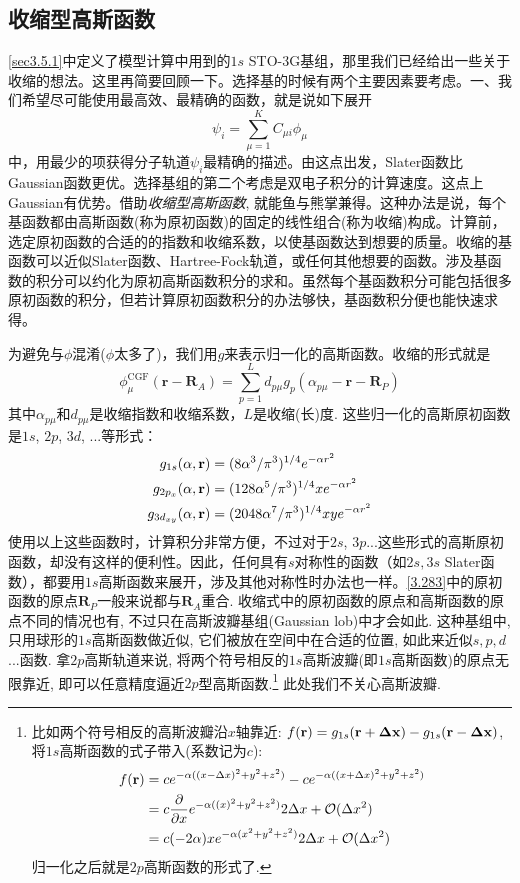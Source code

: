 {\subsection{收缩型高斯函数}
\ref{sec3.5.1}中定义了模型计算中用到的$1s$ STO-3G基组，那里我们已经给出一些关于收缩的想法。这里再简要回顾一下。选择基的时候有两个主要因素要考虑。一、我们希望尽可能使用最高效、最精确的函数，就是说如下展开
\begin{equation}
\psi_i=\sum_{\mu=1}^{K}C_{\mu i}\phi_\mu
\end{equation}
中，用最少的项获得分子轨道$\psi_i$最精确的描述。由这点出发，Slater函数比Gaussian函数更优。选择基组的第二个考虑是双电子积分的计算速度。这点上Gaussian有优势。借助\emph{收缩型高斯函数}, 就能鱼与熊掌兼得。这种办法是说，每个基函数都由高斯函数(称为原初函数)的固定的线性组合(称为收缩)构成。计算前，选定原初函数的合适的的指数和收缩系数，以使基函数达到想要的质量。收缩的基函数可以近似Slater函数、Hartree-Fock轨道，或任何其他想要的函数。涉及基函数的积分可以约化为原初高斯函数积分的求和。虽然每个基函数积分可能包括很多原初函数的积分，但若计算原初函数积分的办法够快，基函数积分便也能快速求得。

为避免与$\phi$混淆($\phi$太多了)，我们用$g$来表示归一化的高斯函数。收缩的形式就是
\begin{equation}
\phi^\mathrm{CGF}_\mu(\mathbf{r-R}_A)=\sum_{p=1}^{L}d_{p\mu}g_p(\alpha_{p\mu}-\mathbf{r-R}_P)
\end{equation}
其中$\alpha_{p\mu}$和$d_{p\mu}$是收缩指数和收缩系数，$L$是收缩(长)度. 这些归一化的高斯原初函数是$1s$, $2p$, $3d$, ...等形式：
\begin{align}
g_{1s}(\alpha,\mathbf{r})      & = (8\alpha^3/\pi^3)^{1/4}       e^{-\alpha r^2}\\
g_{2p_x}(\alpha,\mathbf{r})    & = (128\alpha^5/\pi^3)^{1/4}  x  e^{-\alpha r^2}\\
g_{3d_{xy}}(\alpha,\mathbf{r}) & = (2048\alpha^7/\pi^3)^{1/4} xy e^{-\alpha r^2}
\end{align}
使用以上这些函数时，计算积分非常方便，不过对于$2s$, $3p$...这些形式的高斯原初函数，却没有这样的便利性。因此，任何具有$s$对称性的函数（如$2s,3s$ Slater函数），都要用$1s$高斯函数来展开，涉及其他对称性时办法也一样。\eqref{3.283}中的原初函数的原点$\mathbf{R}_P$一般来说都与$\mathbf{R}_A$重合. 收缩式中的原初函数的原点和高斯函数的原点不同的情况也有, 不过只在高斯波瓣基组(Gaussian lob)中才会如此. 这种基组中, 只用球形的$1s$高斯函数做近似, 它们被放在空间中在合适的位置, 如此来近似$s,p,d$...函数. 拿$2p$高斯轨道来说, 将两个符号相反的$1s$高斯波瓣(即$1s$高斯函数)的原点无限靠近, 即可以任意精度逼近$2p$型高斯函数.\footnote{
比如两个符号相反的高斯波瓣沿$x$轴靠近: $f(\mathbf{r})=g_{1s}(\mathbf{r}+\mathbf{\Delta x})-g_{1s}(\mathbf{r}-\mathbf{\Delta x})$, 将$1s$高斯函数的式子带入(系数记为$c$):
\begin{align*}
f(\mathbf{r}) & = ce^{-\alpha((x-\Delta x)^2+y^2+z^2)}-
ce^{-\alpha((x+\Delta x)^2+y^2+z^2)}\\
        & = c\frac{\partial}{\partial x}e^{-\alpha((x)^2+y^2+z^2)}2\Delta x +\mathcal{O}(\Delta x^2)\\
        & = c(-2\alpha) xe^{-\alpha(x^2+y^2+z^2)}2\Delta x +\mathcal{O}(\Delta x^2)
\end{align*}
归一化之后就是$2p$高斯函数的形式了.
}
此处我们不关心高斯波瓣.

}
